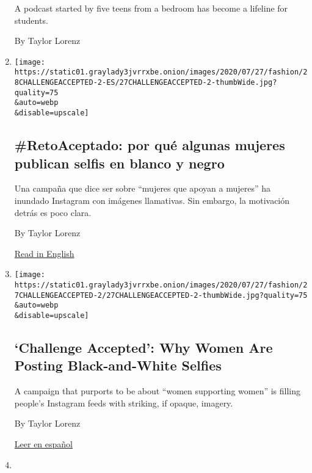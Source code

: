 \begin{enumerate}
  A podcast started by five teens from a bedroom has become a lifeline
  for students.

  By Taylor Lorenz
\item
  \href{/es/2020/07/28/espanol/estilos-de-vida/reto-selfi-blanco-negro.html}{}

  \texttt{[image: https://static01.graylady3jvrrxbe.onion/images/2020/07/27/fashion/28CHALLENGEACCEPTED-2-ES/27CHALLENGEACCEPTED-2-thumbWide.jpg?quality=75\\\&auto=webp\\\&disable=upscale]}

  \hypertarget{retoaceptado-por-quuxe9-algunas-mujeres-publican-selfis-en-blanco-y-negro}{%
  \subsection{\#RetoAceptado: por qué algunas mujeres publican selfis en
  blanco y
  negro}\label{retoaceptado-por-quuxe9-algunas-mujeres-publican-selfis-en-blanco-y-negro}}

  Una campaña que dice ser sobre ``mujeres que apoyan a mujeres'' ha
  inundado Instagram con imágenes llamativas. Sin embargo, la motivación
  detrás es poco clara.

  By Taylor Lorenz

  \href{https://www.nytimes3xbfgragh.onion/2020/07/27/style/challenge-accepted-instagram.html}{Read
  in English}
\item
  \href{/2020/07/27/style/challenge-accepted-instagram.html}{}

  \texttt{[image: https://static01.graylady3jvrrxbe.onion/images/2020/07/27/fashion/27CHALLENGEACCEPTED-2/27CHALLENGEACCEPTED-2-thumbWide.jpg?quality=75\\\&auto=webp\\\&disable=upscale]}

  \hypertarget{challenge-accepted-why-women-are-posting-black-and-white-selfies}{%
  \subsection{`Challenge Accepted': Why Women Are Posting
  Black-and-White
  Selfies}\label{challenge-accepted-why-women-are-posting-black-and-white-selfies}}

  A campaign that purports to be about ``women supporting women'' is
  filling people's Instagram feeds with striking, if opaque, imagery.

  By Taylor Lorenz

  \href{https://www.nytimes3xbfgragh.onion/es/2020/07/28/espanol/estilos-de-vida/reto-selfi-blanco-negro.html}{Leer
  en español}
\item
  \href{/2020/07/24/style/omegle-random-video-chat.html}{}


\end{enumerate}
